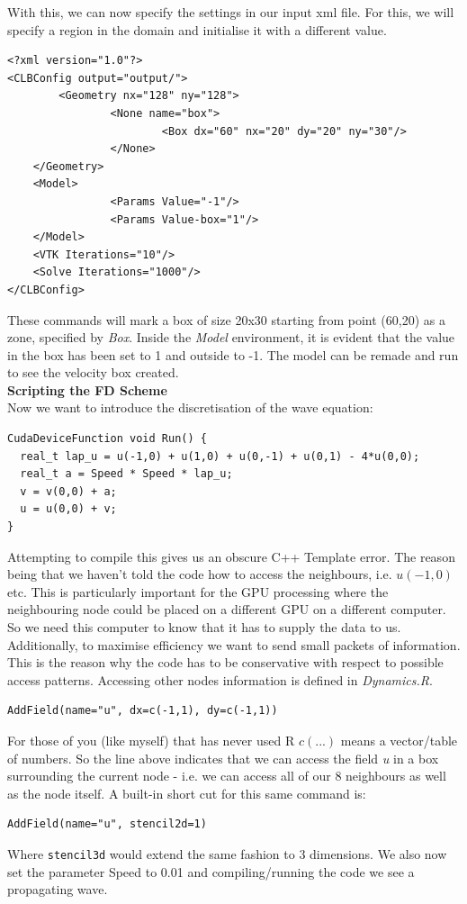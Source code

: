 \documentclass[12pt,a4paper]{report}
\begin{document}
With this, we can now specify the settings in our input xml file. For this, we will specify a region in the domain and initialise it with a different value.
\begin{lstlisting}
<?xml version="1.0"?>
<CLBConfig output="output/">
        <Geometry nx="128" ny="128">
                <None name="box">
                        <Box dx="60" nx="20" dy="20" ny="30"/>
                </None>
    </Geometry>
    <Model>
                <Params Value="-1"/>
                <Params Value-box="1"/>
    </Model>
    <VTK Iterations="10"/>
    <Solve Iterations="1000"/>
</CLBConfig>
\end{lstlisting}
These commands will mark a box of size 20x30 starting from point (60,20) as a zone, specified by \textit{Box}. Inside the \textit{Model} environment, it is evident that the value in the box has been set to 1 and outside to -1. The model can be remade and run to see the velocity box created. \\

\textbf{Scripting the FD Scheme} \\
Now we want to introduce the discretisation of the wave equation:
\begin{lstlisting}
CudaDeviceFunction void Run() {
  real_t lap_u = u(-1,0) + u(1,0) + u(0,-1) + u(0,1) - 4*u(0,0);
  real_t a = Speed * Speed * lap_u;
  v = v(0,0) + a;
  u = u(0,0) + v;
}
\end{lstlisting}
Attempting to compile this gives us an obscure C++ Template error. The reason being that we haven't told the code how to access the neighbours, i.e. $u(-1,0)$ etc. This is particularly important for the GPU processing where the neighbouring node could be placed on a different GPU on a different computer. So we need this computer to know that it has to supply the data to us. Additionally, to maximise efficiency we want to send small packets of information. This is the reason why the code has to be conservative with respect to possible access patterns. Accessing other nodes information is defined in \textit{Dynamics.R}.
\begin{lstlisting}
AddField(name="u", dx=c(-1,1), dy=c(-1,1))
\end{lstlisting}

For those of you (like myself) that has never used R $c(...)$ means a vector/table of numbers. So the line above indicates that we can access the field \textit{u} in a box surrounding the current node - i.e. we can access all of our 8 neighbours as well as the node itself. A built-in short cut for this same command is:
\begin{lstlisting}
AddField(name="u", stencil2d=1)
\end{lstlisting}
Where \lstinline$stencil3d$ would extend the same fashion to 3 dimensions. We also now set the parameter Speed to 0.01 and compiling/running the code we see a propagating wave. \\
\end{document}
